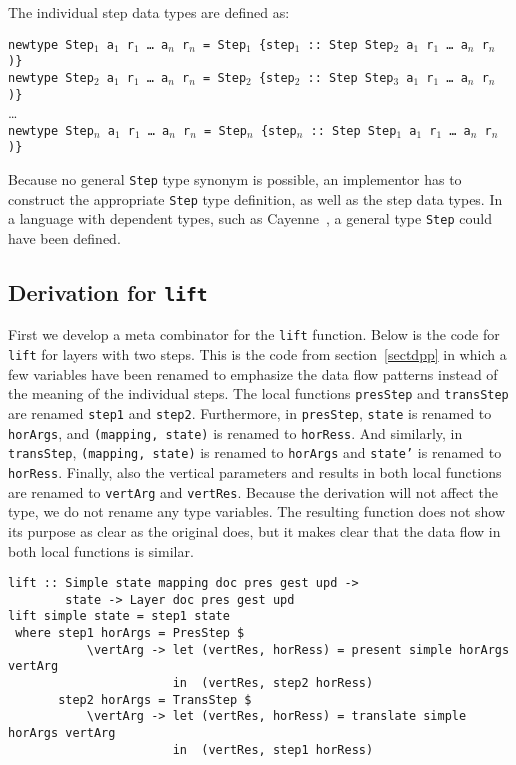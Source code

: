 \par The individual step data types are defined as:\par
{\tt newtype Step$_1$ a$_1$ r$_1$ \dots ~a$_n$ r$_n$ = Step$_1$ \{step$_1$}\verb| :: |{\tt Step Step$_2$ a$_1$ r$_1$ \dots ~a$_n$ r$_n$ )\}}\\
{\tt newtype Step$_2$ a$_1$ r$_1$ \dots ~a$_n$ r$_n$ = Step$_2$ \{step$_2$}\verb| :: |{\tt Step Step$_3$ a$_1$ r$_1$ \dots ~a$_n$ r$_n$ )\}}\\
\dots\\
{\tt newtype Step$_n$ a$_1$ r$_1$ \dots ~a$_n$ r$_n$ = Step$_n$ \{step$_n$}\verb| :: |{\tt Step Step$_1$ a$_1$ r$_1$ \dots ~a$_n$ r$_n$ )\}}

\par Because no general \texttt{Step} type synonym is possible, an
        implementor has to construct the appropriate \texttt{Step} type definition, as
        well as the step data types. In a language with dependent types, such as
        Cayenne~\cite{cayenne}, a general type \texttt{Step} could have
        been defined.
\subsection{Derivation for \texttt{lift}}

\par First we develop a meta combinator for the \texttt{lift} function.
        Below is the code for \texttt{lift} for layers with two steps. This is the code
        from section~\ref{sectdpp} in which a few variables have been
        renamed to emphasize the data flow patterns instead of the meaning of the
        individual steps. The local functions \texttt{presStep} and \texttt{transStep}
        are renamed \texttt{step1} and \texttt{step2}. Furthermore, in
        \texttt{presStep}, \texttt{state} is renamed to \texttt{horArgs}, and
        \texttt{(mapping, state)} is renamed to \texttt{horRess}. And similarly, in
        \texttt{transStep}, \texttt{(mapping, state)} is renamed to \texttt{horArgs}
        and \texttt{state'} is renamed to \texttt{horRess}. Finally, also the vertical
        parameters and results in both local functions are renamed to \texttt{vertArg}
        and \texttt{vertRes}. Because the derivation will not affect the type, we do
        not rename any type variables. The resulting function does not show its purpose
        as clear as the original does, but it makes clear that the data flow in both
        local functions is similar.\begin{small}\begin{verbatim}lift :: Simple state mapping doc pres gest upd ->
        state -> Layer doc pres gest upd
lift simple state = step1 state 
 where step1 horArgs = PresStep $ 
           \vertArg -> let (vertRes, horRess) = present simple horArgs vertArg                                         
                       in  (vertRes, step2 horRess)
       step2 horArgs = TransStep $
           \vertArg -> let (vertRes, horRess) = translate simple horArgs vertArg                     
                       in  (vertRes, step1 horRess)\end{verbatim}\end{small}

